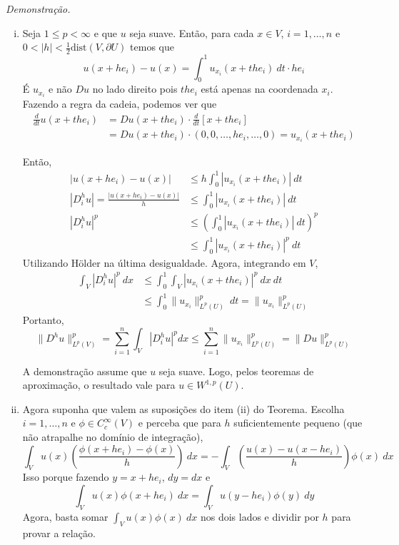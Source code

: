 \documentclass[a4paper, 11pt]{book}
\newcommand{\pu}{\partial U}
\begin{document}
\textit{Demonstração.}
\begin{enumerate}[(i)]
	\item Seja $1 \leq p < \infty$ e que $u$ seja suave. Então, para cada $x \in V$, $i = 1,\ldots,n$ e $0<|h|<\frac{1}{2}\text{dist}(V, \pu)$ temos que \[
	u(x+ he_i) - u(x) = \int_0^1 u_{x_i}(x + the_i)\ dt \cdot he_i	
	\]
	É $u_{x_i}$ e não $Du$ no lado direito pois $the_i$ está apenas na coordenada $x_i$. Fazendo a regra da cadeia, podemos ver que 
	\begin{align*}
		\frac{d}{dt}u(x+the_i) &= Du(x+the_i)\cdot \frac{d}{dt}\left[ x+the_i \right] \\
		&= Du(x+the_i)\cdot (0, 0, \dots, he_i, \dots, 0) = u_{x_i}(x+the_i)
	\end{align*}
	
	Então, \begin{align*}
		|u(x+he_i)-u(x)| &\leq h \int_0^1 |u_{x_i}(x+the_i)|\ dt \\
		|D^h_iu| = \frac{|u(x+he_i)-u(x)|}{h} &\leq \int_0^1 |u_{x_i}(x+the_i)|\ dt	\\
		|D^h_iu|^p &\leq \left(  \int_0^1 |u_{x_i}(x+the_i)|\ dt     \right)^p  \\
		&\leq \int_0^1 |u_{x_i}(x+the_i)|^p \ dt
	\end{align*}
	Utilizando Hölder na última desigualdade. Agora, integrando em $V$,
	\begin{align*}
		\int_{V}	|D^h_iu|^p \ dx &\leq  \int_0^1  \int_{V}|u_{x_i}(x+the_i)|^p \ dx\ dt \\
		&\leq \int_0^1 \|u_{x_i}\|_{L^p(U)}^p \ dt = \|u_{x_i}\|_{L^p(U)}^p
	\end{align*}
	Portanto,
	\[	
	\|D^hu\|_{L^p(V)}^p = \sum_{i=1}^n \int_{V} |D^h_i u |^p dx \leq \sum_{i=1}^n  \|u_{x_i}\|_{L^p(U)}^p = \|Du\|_{L^p(U)}^p
	\]

	A demonstração assume que $u$ seja suave. Logo, pelos teoremas de aproximação, o resultado vale para $u \in W^{1,p}(U)$.
	
	\item Agora suponha que valem as suposições do item (ii) do Teorema. Escolha $i=1,\ldots,n$ e $\phi \in C^\infty_c(V)$ e perceba que para $h$ suficientemente pequeno (que não atrapalhe no domínio de integração), \[
	\int_V u(x) \left( \frac{\phi(x+he_i) - \phi(x)}{h} \right)\ dx = - \int_V \left( \frac{u(x) - u(x-he_i)}{h} \right) \phi(x)\ dx
	\]
	Isso porque fazendo $y=x+he_i$, $dy=dx$ e \[
		\int_V u(x)\phi(x+he_i)\ dx = \int_V u(y - he_i)\phi(y)\ dy
	\] Agora, basta somar $\int_V u(x)\phi(x)\ dx$ nos dois lados e dividir por $h$ para provar a relação.
	

\end{enumerate}
\end{document}
